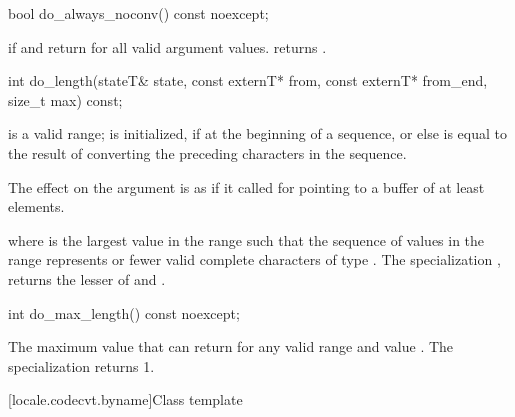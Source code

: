 %
\begin{itemdecl}
bool do_always_noconv() const noexcept;
\end{itemdecl}

\begin{itemdescr}
\pnum
\returns
{} if  and  return 
for all valid argument values.
 returns .
\end{itemdescr}

%
\begin{itemdecl}
int do_length(stateT& state, const externT* from, const externT* from_end, size_t max) const;
\end{itemdecl}

\begin{itemdescr}
\pnum
\expects
{} is a valid range;
 is initialized, if at the beginning of a sequence,
or else is equal to the result of converting
the preceding characters in the sequence.

\pnum
\effects
The effect on the  argument is as if
it called 
for  pointing to a buffer of at least  elements.

\pnum
\returns
{} where
 is the largest value in the range 
such that the sequence of values in the range 
represents
 or fewer valid complete characters of type .
The specialization ,
returns the lesser of  and .
\end{itemdescr}

%
\begin{itemdecl}
int do_max_length() const noexcept;
\end{itemdecl}

\begin{itemdescr}
\pnum
\returns
The maximum value that  can return
for any valid range 
and  value .
The specialization 
returns 1.
\end{itemdescr}

[locale.codecvt.byname]{Class template }


